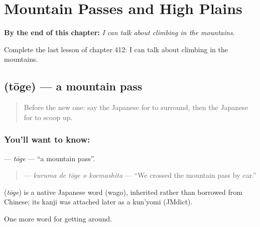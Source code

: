 
\chapter{Mountain Passes and High Plains}
\label{ch:ja-mountain-passes-and-high-plains}

\begin{chapteropening}
\textbf{By the end of this chapter:} \emph{I can talk about climbing in the mountains.}

Complete the last lesson of chapter 412: I can talk about climbing in the mountains.
\end{chapteropening}

\section[\texorpdfstring{\ja{とうげ} (tōge)}{とうげ (tōge)}]{ (tōge) — a mountain pass}

\label{lesson:JA-C412-touge}



\begin{quote}
Before the new one: say the Japanese for to surround, then the Japanese for to scoop up.
\end{quote}

\subsection*{You'll want to know: }
\textbf{} — \emph{tōge} — \textquotedblleft{}a mountain pass\textquotedblright{}.

\begin{quote}
\textbf{  } — \emph{kuruma de tōge o koemashita} — \textquotedblleft{}We crossed the mountain pass by car.\textquotedblright{}
\end{quote}

\begin{cousinweb}
\textbf{} (\emph{tōge}) is a native Japanese word (wago), inherited rather than borrowed from Chinese; its kanji was attached later as a kun'yomi (JMdict).
\end{cousinweb}

\begin{grammarlens}[title={What you've built}]
One more word for getting around.
\end{grammarlens}

